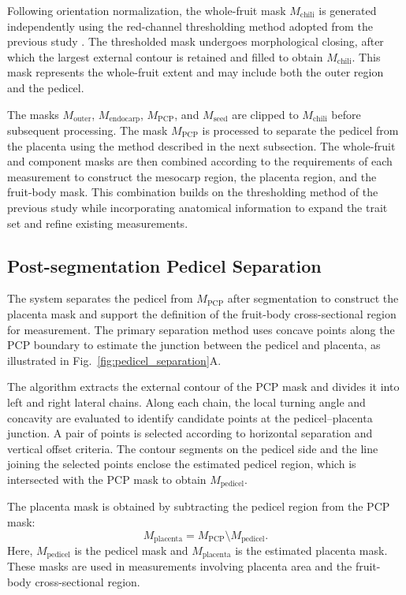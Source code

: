 \documentclass[final,5p,times,twocolumn]{elsarticle}
\begin{document}
Following orientation normalization, the whole-fruit mask $M_{\mathrm{chili}}$ is generated independently using the red-channel thresholding method adopted from the previous study \cite{ver1}. The thresholded mask undergoes morphological closing, after which the largest external contour is retained and filled to obtain $M_{\mathrm{chili}}$. This mask represents the whole-fruit extent and may include both the outer region and the pedicel.

The masks $M_{\mathrm{outer}}$, $M_{\mathrm{endocarp}}$, $M_{\mathrm{PCP}}$, and $M_{\mathrm{seed}}$ are clipped to $M_{\mathrm{chili}}$ before subsequent processing. The mask $M_{\mathrm{PCP}}$ is processed to separate the pedicel from the placenta using the method described in the next subsection. The whole-fruit and component masks are then combined according to the requirements of each measurement to construct the mesocarp region, the placenta region, and the fruit-body mask. This combination builds on the thresholding method of the previous study while incorporating anatomical information to expand the trait set and refine existing measurements.

\subsection*{Post-segmentation Pedicel Separation}
The system separates the pedicel from $M_{\mathrm{PCP}}$ after segmentation to construct the placenta mask and support the definition of the fruit-body cross-sectional region for measurement. The primary separation method uses concave points along the PCP boundary to estimate the junction between the pedicel and placenta, as illustrated in Fig.~\ref{fig:pedicel_separation}A.

The algorithm extracts the external contour of the PCP mask and divides it into left and right lateral chains. Along each chain, the local turning angle and concavity are evaluated to identify candidate points at the pedicel--placenta junction. A pair of points is selected according to horizontal separation and vertical offset criteria. The contour segments on the pedicel side and the line joining the selected points enclose the estimated pedicel region, which is intersected with the PCP mask to obtain $M_{\mathrm{pedicel}}$.



The placenta mask is obtained by subtracting the pedicel region from the PCP mask:
\begin{equation}
    M_{\mathrm{placenta}} = M_{\mathrm{PCP}} \setminus M_{\mathrm{pedicel}}.
\end{equation}
Here, $M_{\mathrm{pedicel}}$ is the pedicel mask and $M_{\mathrm{placenta}}$ is the estimated placenta mask. These masks are used in measurements involving placenta area and the fruit-body cross-sectional region.
\end{document}

